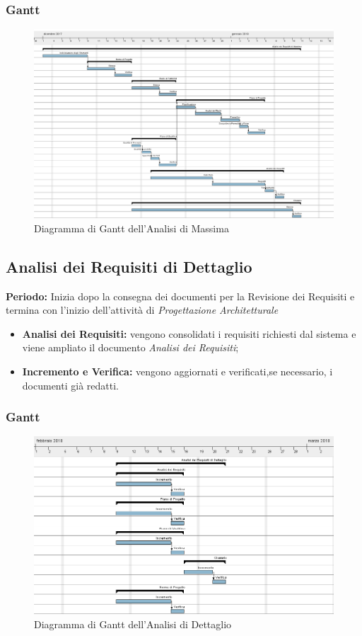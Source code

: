 \subsubsection{Gantt}
\begin{figure}[H]
	\centering 
	\includegraphics[width=1\textwidth]{images/Analisi-di-Massima.png}
	\caption{Diagramma di Gantt dell'Analisi di Massima}
	\label{graficobello} 
\end{figure}
\subsection{Analisi dei Requisiti di Dettaglio}
    \textbf{Periodo:}
    Inizia dopo la consegna dei documenti per la Revisione dei Requisiti e termina con l'inizio dell'attività di \emph{Progettazione Architetturale}
    \begin{itemize}
    	\item \textbf{Analisi dei Requisiti:} vengono consolidati i requisiti richiesti dal sistema e viene ampliato il documento \emph{Analisi dei Requisiti};
    	\item \textbf{Incremento e Verifica:} vengono aggiornati e verificati,se necessario, i documenti già redatti. 
    \end{itemize}
\subsubsection{Gantt}
\begin{figure}[H]
	\centering 
	\includegraphics[width=1\textwidth]{images/Analisi-Dettaglio.png}
	\caption{Diagramma di Gantt dell'Analisi di Dettaglio}
	\label{graficobello2} 
\end{figure}
